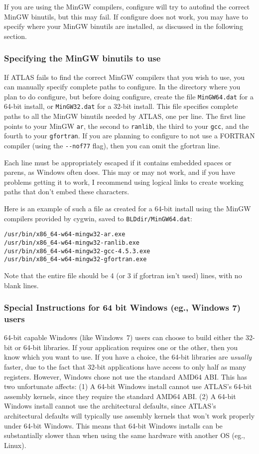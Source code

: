 \documentclass[11pt]{article}
\begin{document}
If you are using the MinGW compilers, configure will try to autofind the
correct MinGW binutils, but this may fail.  If configure does not work,
you may have to specify where your MinGW binutils are installed, as discussed
in the following section.

\subsubsection{Specifying the MinGW binutils to use}
If ATLAS fails to find the correct MinGW compilers that you wish to use,
you can manually specify complete paths to configure.  In the directory
where you plan to do configure, but before doing configure, create the
file \verb+MinGW64.dat+ for a 64-bit install, or \verb+MinGW32.dat+ for
a 32-bit install.  This file specifies complete paths to all the MinGW
binutils needed by ATLAS, one per line.  The first line points to
your MinGW \verb+ar+, the second to \verb+ranlib+, the third to your \verb+gcc+,
and the fourth to your \verb+gfortran+.  If you are planning to configure
to not use a FORTRAN compiler (using the \verb+--nof77+ flag), then
you can omit the gfortran line.

Each line must be appropriately escaped if it contains embedded spaces or
parens, as Windows often does.  This may or may not work, and if you have
problems getting it to work, I recommend using logical links to create
working paths that don't embed these characters.

Here is an example of such a file as created for a 64-bit install using the
MinGW compilers provided by cygwin, saved to \verb+BLDdir/MinGW64.dat+:
\begin{verbatim}
/usr/bin/x86_64-w64-mingw32-ar.exe
/usr/bin/x86_64-w64-mingw32-ranlib.exe
/usr/bin/x86_64-w64-mingw32-gcc-4.5.3.exe
/usr/bin/x86_64-w64-mingw32-gfortran.exe
\end{verbatim}
Note that the entire file should be 4 (or 3 if gfortran isn't used) lines, 
with no blank lines.

\subsubsection{Special Instructions for 64 bit Windows (eg., Windows 7) users}
\label{sec-windows64}

64-bit capable Windows (like Windows~7) users can choose to build either
the 32-bit or 64-bit libraries.  If your application requires one or the
other, then you know which you want to use.  If you have a choice,
the 64-bit libraries are {\em usually} faster, due to the fact that
32-bit applications have access to only half as many registers.  However,
Windows chose not use the standard AMD64 ABI.  This has two
unfortunate affects: (1) A 64-bit Windows install cannot use ATLAS's
64-bit assembly kernels, since they require the standard AMD64 ABI.
(2) A 64-bit Windows install cannot use the architectural defaults,
since ATLAS's architectural defaults will typically use assembly kernels
that won't work properly under 64-bit Windows.  This means that 64-bit
Windows installs can be substantially slower than when using the same
hardware with another OS (eg., Linux).
\end{document}
